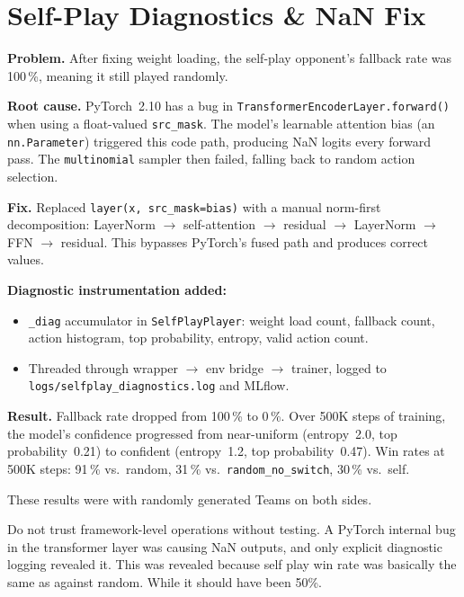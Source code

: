 \section{Self-Play Diagnostics \& NaN Fix}

\textbf{Problem.} After fixing weight loading, the self-play opponent's
fallback rate was 100\,\%, meaning it still played randomly.

\textbf{Root cause.} PyTorch~2.10 has a bug in
\texttt{TransformerEncoderLayer.forward()} when using a float-valued
\texttt{src\_mask}.  The model's learnable attention bias (an
\texttt{nn.Parameter}) triggered this code path, producing NaN logits every
forward pass.  The \texttt{multinomial} sampler then failed, falling back to
random action selection.

\textbf{Fix.} Replaced \texttt{layer(x, src\_mask=bias)} with a manual
norm-first decomposition: LayerNorm $\to$ self-attention $\to$ residual
$\to$ LayerNorm $\to$ FFN $\to$ residual.  This bypasses PyTorch's fused path
and produces correct values.

\textbf{Diagnostic instrumentation added:}
\begin{itemize}
  \item \texttt{\_diag} accumulator in \texttt{SelfPlayPlayer}: weight load
        count, fallback count, action histogram, top probability, entropy,
        valid action count.
  \item Threaded through wrapper $\to$ env bridge $\to$ trainer, logged to
        \texttt{logs/selfplay\_diagnostics.log} and MLflow.
\end{itemize}

\textbf{Result.} Fallback rate dropped from 100\,\% to 0\,\%.  Over 500K
steps of training, the model's confidence progressed from near-uniform
(entropy~2.0, top probability~0.21) to confident (entropy~1.2, top
probability~0.47).  Win rates at 500K steps: 91\,\% vs.\ random, 31\,\%
vs.\ \texttt{random\_no\_switch}, 30\,\% vs.\ self.

These results were with randomly generated Teams on both sides.

\begin{keyinsight}
Do not trust framework-level operations without testing.  A PyTorch internal
bug in the transformer layer was causing NaN outputs, and only explicit
diagnostic logging revealed it. This was revealed because self play win rate was basically the same as against random. While it should have been 50\%. 
\end{keyinsight}

